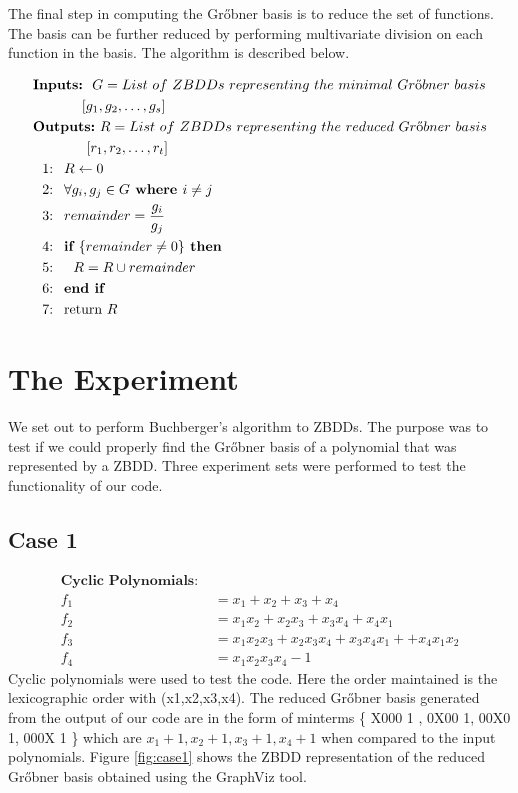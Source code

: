 \documentclass[letterpaper, 10 pt, conference]{ieeeconf}
\begin{document}
The final step in computing the Gr{\H o}bner basis is to reduce the set of functions.  The basis can be further reduced by performing multivariate division on each function in the basis.  The algorithm is described below.
{\small
\begin{align*}
&\textbf{Inputs:}\ \ G = List\ of\ ZBDDs\ representing\ the\ minimal\ Gr\text{{\H o}}bner\ basis \\
&\ \ \ \ \ \ \ \ \ \ \left[ g_{1},g_{2},\ldots ,g_s \right] \\
&\textbf{Outputs:}\ R = List\ of\ ZBDDs\ representing\ the\ reduced\ Gr\text{{\H o}}bner\ basis \\
&\ \ \ \ \ \ \ \ \ \ \ \left[ r_{1},r_{2},\ldots ,r_t \right]\\
&\ \ \text{1: }\ R \leftarrow 0 \\
&\ \ \text{2: }\ \forall g_{i},g_{j} \in G \textbf{ where } i \not= j \\
&\ \ \text{3: }\ remainder = \frac{g_{i}}{g_{j}} \\
&\ \ \text{4: }\ \textbf{if } \{ remainder \not= 0 \} \textbf{ then} \\
&\ \ \text{5: }\ \ \ R = R \cup remainder \\
&\ \ \text{6: }\ \textbf{end if} \\
&\ \ \text{7: }\ \text{return } R
\end{align*}
\par}
\section{The Experiment}
\label{sec:experiment}
We set out to perform Buchberger's algorithm to ZBDDs.  The purpose was to test if we could properly find the Gr{\H o}bner basis of a polynomial that was represented by a ZBDD.  Three experiment sets were performed to test the functionality of our code.

\subsection{Case 1}
\label{sec:case1}
\begin{align*}
\textbf{Cyclic Polynomials: } \\
f_{1} &= x_{1}+x_{2}+x_{3}+x_{4} \\
f_{2} &= x_{1}x_{2}+x_{2}x_{3}+x_{3}x_{4}+x_{4}x_{1} \\
f_{3} &= x_{1}x_{2}x_{3}+x_{2}x_{3}x_{4}+x_{3}x_{4}x_{1}++x_{4}x_{1}x_{2}\\
f_{4} &= x_{1}x_{2}x_{3}x_{4}-1
\end{align*}
Cyclic polynomials were used to test the code. Here the order maintained is the lexicographic order with (x1,x2,x3,x4). The reduced Gr{\H o}bner basis generated from the output of our code are in the form of minterms \{ X000 1 , 0X00 1, 00X0 1, 000X 1 \} which are $x_{1} + 1, x_{2} + 1, x_{3} + 1, x_{4} + 1$ when compared to the input polynomials. Figure \ref{fig:case1} shows the ZBDD representation of the reduced Gr{\H o}bner basis obtained using the GraphViz tool.
\end{document}
